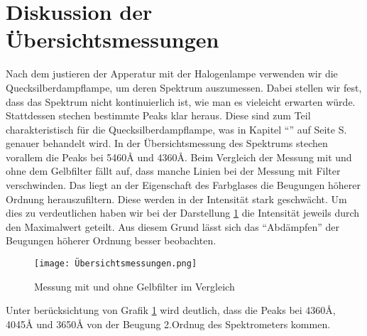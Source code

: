 \section{Diskussion der Übersichtsmessungen}

Nach dem justieren der Apperatur mit der Halogenlampe verwenden wir die Quecksilberdampflampe, um deren Spektrum auszumessen.
Dabei stellen wir fest, dass das Spektrum nicht kontinuierlich ist, wie man es vieleicht erwarten würde.
Stattdessen stechen bestimmte Peaks klar heraus. Diese sind zum Teil charakteristisch für die Quecksilberdampflampe, was in 
Kapitel "`"' auf Seite S.\pageref{Messlit} genauer behandelt wird.\newline
In der Übersichtsmessung des Spektrums stechen vorallem die Peaks bei 5460\r{A} und 4360\r{A}.
Beim Vergleich der Messung mit und ohne dem Gelbfilter fällt auf, dass manche Linien bei der Messung mit Filter verschwinden. Das liegt an der Eigenschaft des 
Farbglases die Beugungen höherer Ordnung herauszufiltern. Diese werden in der Intensität stark geschwächt. Um dies zu verdeutlichen haben wir bei der Darstellung \ref{Übersichtsmessungen}  die Intensität
jeweils durch den Maximalwert geteilt. Aus diesem Grund lässt sich das "`Abdämpfen"' der Beugungen höherer Ordnung besser  beobachten.

\begin{figure}[h]
    \centering
    \texttt{[image: Übersichtsmessungen.png]}
    \caption{Messung mit und ohne Gelbfilter im Vergleich}
    \label{Übersichtsmessungen}
\end{figure}

Unter berücksichtung von Grafik \ref{Übersichtsmessungen} wird deutlich, dass die Peaks bei 4360\r{A}, 4045\r{A} und 3650\r{A} von der Beugung 2.Ordnug des Spektrometers kommen.

